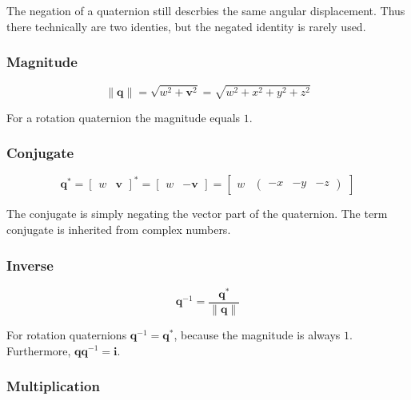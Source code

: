The negation of a quaternion still descrbies the same angular displacement. Thus there technically are two identies, but the negated identity is rarely used.

\subsubsection{Magnitude}

$$\|\textbf{q}\|=\sqrt{w^2+\textbf{v}^2}=\sqrt{w^2+x^2+y^2+z^2}$$

For a rotation quaternion the magnitude equals $1$.

\subsubsection{Conjugate}

$$\textbf{q}^*=\begin{bmatrix}
	w & \textbf{v}
\end{bmatrix}^*=\begin{bmatrix}
	w & -\textbf{v}
\end{bmatrix}=\begin{bmatrix}
	w & \begin{pmatrix}
		-x & -y & -z
	\end{pmatrix}
\end{bmatrix}$$

The conjugate is simply negating the vector part of the quaternion. The term conjugate is inherited from complex numbers.

\subsubsection{Inverse}

$$\textbf{q}^{-1}=\frac{\textbf{q}^*}{\|\textbf{q}\|}$$

For rotation quaternions $\textbf{q}^{-1}=\textbf{q}^*$, because the magnitude is always $1$. Furthermore, $\textbf{q}\textbf{q}^{-1}=\textbf{i}$.

\subsubsection{Multiplication}

